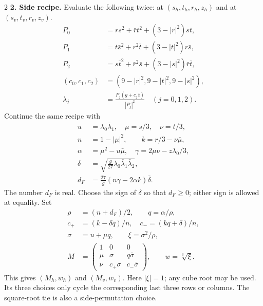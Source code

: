 \documentclass[10pt]{article}
\begin{document}
\begin{multicols}{2}
\textbf{2. Side recipe.} Evaluate the following twice: at $(s_h,t_h,r_h,z_h)$ and at $(s_v,t_v,r_v,z_v)$.
\[
\begin{aligned}
P_0&=rs^2+\bar r t^2+(3-|r|^2)st,\\
P_1&=t\bar s^2+r^2\bar t+(3-|t|^2)r\bar s,\\
P_2&=s\bar t^2+\bar r^2\bar s+(3-|s|^2)\bar r\bar t,\\
(c_0,c_1,c_2)&=(9-|r|^2,9-|t|^2,9-|s|^2),\\
\lambda_j&=\frac{P_j(g+c_j\bar z)}{|P_j|^2}\quad(j=0,1,2).
\end{aligned}
\]
\columnbreak
Continue the same recipe with
\[
\begin{aligned}
u&=\lambda_0\bar\lambda_1,\quad \mu=s/3,\quad\nu=t/3,\\
n&=1-|\mu|^2,\qquad k=r/3-\nu\bar\mu,\\
\alpha&=\mu^2-u\bar\mu,\quad\gamma=2\mu\nu-z\lambda_0/3,\\
\delta&=\sqrt{\frac{g}{27}\lambda_0\bar\lambda_1\bar\lambda_2},\\
d_F&=\frac{27}{g}(n\gamma-2\alpha k)\bar\delta.
\end{aligned}
\]
The number $d_F$ is real. Choose the sign of $\delta$ so that $d_F\geq0$; either sign is allowed at equality. Set
\[
\begin{aligned}
\rho&=(n+d_F)/2,\qquad q=\alpha/\rho,\\
c_+&=(k-\delta\bar q)/n,\quad c_-=(kq+\delta)/n,\\
\sigma&=u+\mu q,\qquad \xi=\sigma^2/\rho,\\
M&=\begin{pmatrix}
1&0&0\\\mu&\sigma&q\bar\sigma\\\nu&c_+\sigma&c_-\bar\sigma
\end{pmatrix},\qquad w=\sqrt[3]{\xi}.
\end{aligned}
\]
This gives $(M_h,w_h)$ and $(M_v,w_v)$. Here $|\xi|=1$; any cube root may be used. Its three choices only cycle the corresponding last three rows or columns. The square-root tie is also a side-permutation choice.


\end{multicols}
\end{document}
